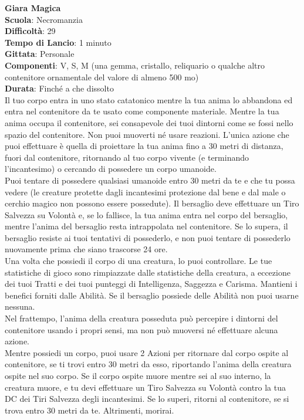 \begin{multicols}{2}
\medskip\textbf{Giara Magica}\\
\textbf{Scuola}: Necromanzia\\
\textbf{Difficoltà}: 29\\
\textbf{Tempo di Lancio}: 1 minuto\\
\textbf{Gittata}: Personale\\
\textbf{Componenti}: V, S, M (una gemma, cristallo, reliquario o qualche altro contenitore ornamentale del valore di almeno 500 mo)\\
\textbf{Durata}: Finché a che dissolto\\
Il tuo corpo entra in uno stato catatonico mentre la tua anima lo abbandona ed entra nel contenitore da te usato come componente materiale. Mentre la tua anima occupa il contenitore, sei consapevole dei tuoi dintorni come se fossi nello spazio del contenitore. Non puoi muoverti né usare reazioni. L'unica azione che puoi effettuare è quella di proiettare la tua anima fino a 30 metri di distanza, fuori dal contenitore, ritornando al tuo corpo vivente (e terminando l'incantesimo) o cercando di possedere un corpo umanoide.\\
Puoi tentare di possedere qualsiasi umanoide entro 30 metri da te e che tu possa vedere (le creature protette dagli incantesimi protezione dal bene e dal male o cerchio magico non possono essere possedute). Il bersaglio deve effettuare un Tiro Salvezza su Volontà e, se lo fallisce, la tua anima entra nel corpo del bersaglio, mentre l'anima del bersaglio resta intrappolata nel contenitore. Se lo supera, il bersaglio resiste ai tuoi tentativi di possederlo, e non puoi tentare di possederlo nuovamente prima che siano trascorse 24 ore.\\
Una volta che possiedi il corpo di una creatura, lo puoi controllare. Le tue statistiche di gioco sono rimpiazzate dalle statistiche della creatura, a eccezione dei tuoi Tratti e dei tuoi punteggi di Intelligenza, Saggezza e Carisma. Mantieni i benefici forniti dalle Abilità. Se il bersaglio possiede delle Abilità non puoi usarne nessuna.\\
Nel frattempo, l'anima della creatura posseduta può percepire i dintorni del contenitore usando i propri sensi, ma non può muoversi né effettuare alcuna azione.\\
Mentre possiedi un corpo, puoi usare 2 Azioni per ritornare dal corpo ospite al contenitore, se ti trovi entro 30 metri da esso, riportando l'anima della creatura ospite nel suo corpo. Se il corpo ospite muore mentre sei al suo interno, la creatura muore, e tu devi effettuare un Tiro Salvezza su Volontà contro la tua DC dei Tiri Salvezza degli incantesimi. Se lo superi, ritorni al contenitore, se si trova entro 30 metri da te. Altrimenti, morirai.\\

\end{multicols}
